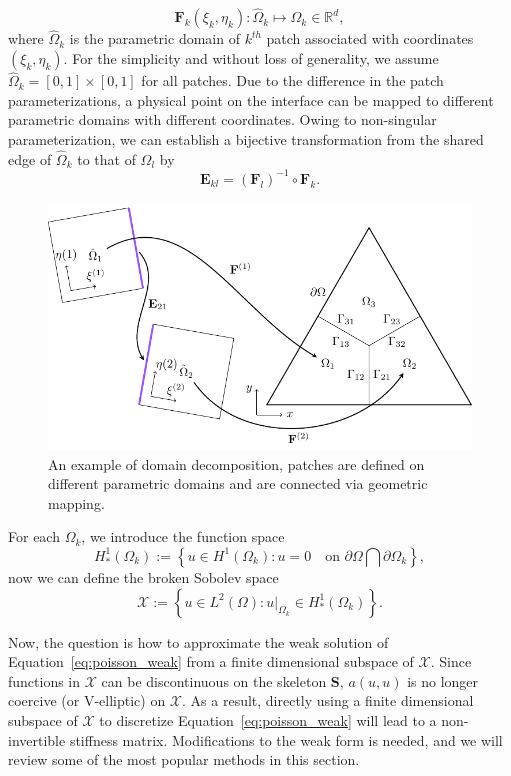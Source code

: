 \documentclass[preprint,12pt]{elsarticle}
\theoremstyle{remark}
\begin{document}
\begin{equation}
  \mathbf{F}_{k}\left(\xi_{k},\eta_{k}\right)\colon{\hat{\Omega}_k}\mapsto{{\Omega}_k}\in\mathbb{R}^d,
\end{equation}
where ${\hat{\Omega}_k}$ is the parametric domain of $k^{th}$ patch associated with coordinates $\left(\xi_{k},\eta_{k}\right)$. For the simplicity and without loss of generality, we assume ${\hat{\Omega}_k}=\left[{0,1}\right]\times\left[{0,1}\right]$ for all patches. Due to the difference in the patch parameterizations, a physical point on the interface can be mapped to different parametric domains with different coordinates. Owing to non-singular parameterization, we can establish a bijective transformation from the shared edge of $\hat{\Omega}_k$ to that of $\hat{\Omega}_l$ by 
\begin{equation}
  \mathbf{E}_{kl}=\left(\mathbf{F}_{l}\right)^{-1}\circ\mathbf{F}_{k}.
\end{equation}
\begin{figure}
    \centering
    \includegraphics[width=.8\linewidth]{patch_partition}
    \caption{An example of domain decomposition, patches are defined on different parametric domains and are connected via geometric mapping.}\label{fig:patch_partition}
\end{figure}\par
For each $\Omega_k$, we introduce the function space
\begin{equation}
    H^1_*(\Omega_k):=\left\{u\in{}H^1(\Omega_k): u=0\quad\text{on } \partial\Omega\bigcap\partial\Omega_k \right\},
\end{equation}
now we can define the broken Sobolev space 
\begin{equation}
    \mathcal{X}:=\left\{u\in{}L^2(\Omega): u\vert_{\Omega_k}\in{}H^1_*(\Omega_k)\right\}.
\end{equation}\par
Now, the question is how to approximate the weak solution of Equation~\eqref{eq:poisson_weak} from a finite dimensional subspace of $\mathcal{X}$. Since functions in $\mathcal{X}$ can be discontinuous on the skeleton $\mathbf{S}$, $a(u,u)$ is no longer coercive (or V-elliptic) on $\mathcal{X}$. As a result, directly using a finite dimensional subspace of $\mathcal{X}$ to discretize Equation~\eqref{eq:poisson_weak} will lead to a  non-invertible stiffness matrix. Modifications to the weak form is needed, and we will review some of the most popular methods in this section.
\end{document}
